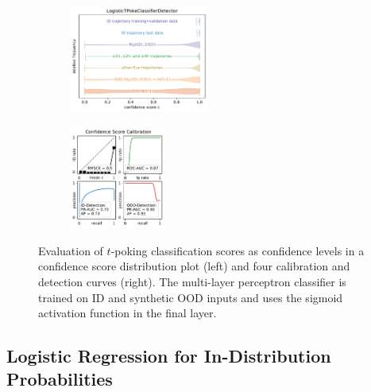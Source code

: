 \begin{figure}[H]
    \centering
    \begin{subfigure}
        \centering
        \includegraphics[width=0.505\textwidth,valign=t]{ood-detection/figures/confidence-score/ood.logistictpokeclassifierdetector-distribution.pdf}
    \end{subfigure}
    \begin{subfigure}
        \centering
        \includegraphics[width=0.345\textwidth,valign=t]{ood-detection/figures/confidence-score/ood.logistictpokeclassifierdetector-calibration.pdf}
    \end{subfigure}

    \caption[Evaluation of $t$-poking Classification Scores as Confidence Levels]{Evaluation of $t$-poking classification scores as confidence levels in a confidence score distribution plot (left) and four calibration and detection curves (right). The multi-layer perceptron classifier is trained on ID and synthetic OOD inputs and uses the sigmoid activation function in the final layer.}
    \label{fig:classifier-t-poke-ood-scoring}
\end{figure}

\subsection{Logistic Regression for In-Distribution Probabilities} \label{txt:ood-logistic-scoring}

